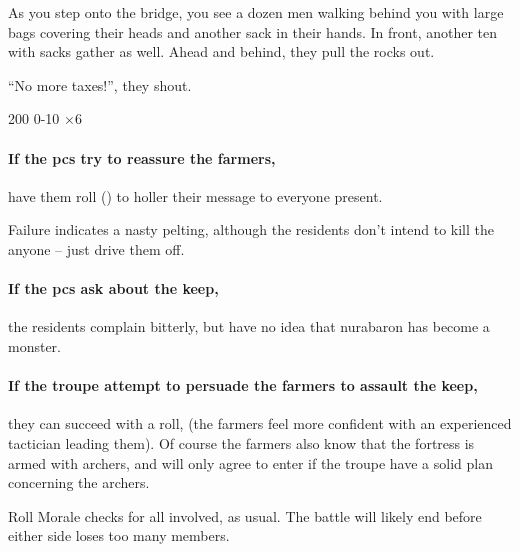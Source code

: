 \begin{multicols}{2}
\begin{boxtext}
  As you step onto the bridge, you see a dozen men walking behind you with large bags covering their heads and another sack in their hands.
  In front, another ten with sacks gather as well.
  Ahead and behind, they pull the rocks out.

  ``No more taxes!'', they shout.
\end{boxtext}

%
  {{2}{0}{0}}%
  {{0}{-1}{0}}%
  {%
    \Dagger
  }%
  {}%
  {\rock $\times 6$}%
  {}%

\paragraph{If the \glspl{pc} try to reassure the farmers,}
have them roll  (\tn[9]) to holler their message to everyone present.

Failure indicates a nasty pelting, although the residents don't intend to kill the anyone -- just drive them off.

\paragraph{If the \glspl{pc} ask about the keep,}
the residents complain bitterly, but have no idea that \gls{nurabaron} has become a monster.

\paragraph{If the troupe attempt to persuade the farmers to assault the keep,}
they can succeed with a  roll, \tn[10]
(the farmers feel more confident with an experienced tactician leading them).
Of course the farmers also know that the fortress is armed with archers, and will only agree to enter if the troupe have a solid plan concerning the archers.

Roll Morale checks for all involved, as usual.%
The battle will likely end before either side loses too many members.



\end{multicols}
